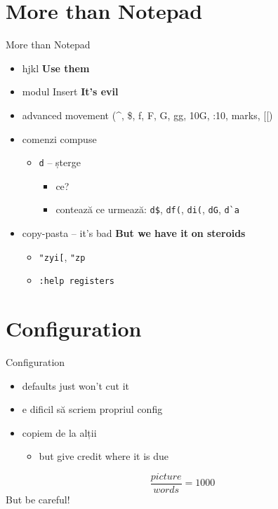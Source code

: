 \documentclass{beamer}
\begin{document}
\section{More than Notepad}
\begin{frame}{More than Notepad}
  \begin{itemize}
    \item hjkl \pause \hspace{1cm} \textbf{Use them}
    \pause
    \item modul Insert \pause \hspace{1cm} \textbf{It's evil}
    \pause
    \item advanced movement (\^{}, \$, f, F, G, gg, 10G, :10, marks, [[)
    \pause
    \item comenzi compuse
    \pause
    \begin{itemize}
      \item \texttt{d} -- șterge
      \begin{itemize}
        \item ce?
        \pause
        \item contează ce urmează: \texttt{d\$}, \texttt{df(}, \texttt{di(},
          \texttt{dG}, \texttt{d\`{}a}
      \end{itemize}
    \end{itemize}
    \pause
    \item copy-pasta -- it's bad \pause \hspace{1cm} \textbf{But we have it}
    \pause \textbf{on steroids}
    \begin{itemize}
      \pause
      \item \texttt{"zyi[}, \texttt{"zp}
      \item \texttt{:help registers}
    \end{itemize}
  \end{itemize}
\end{frame}

\section{Configuration}
\begin{frame}{Configuration}
  \begin{itemize}
    \item defaults just won't cut it
    \item e dificil să scriem propriul config
    \item copiem de la alții
    \pause
    \begin{itemize}
      \item but give credit where it is due
    \end{itemize}
  \end{itemize}
  \pause
  $$ \frac{picture}{words} = 1000 $$
  \pause
But be careful!
\end{frame}
\end{document}
